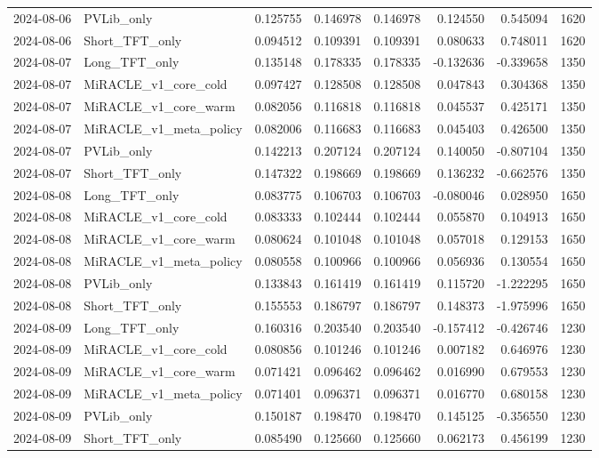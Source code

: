 \begin{tabular}{llrrrrrr}
2024-08-06 & PVLib_only & 0.125755 & 0.146978 & 0.146978 & 0.124550 & 0.545094 & 1620 \\
2024-08-06 & Short_TFT_only & 0.094512 & 0.109391 & 0.109391 & 0.080633 & 0.748011 & 1620 \\
2024-08-07 & Long_TFT_only & 0.135148 & 0.178335 & 0.178335 & -0.132636 & -0.339658 & 1350 \\
2024-08-07 & MiRACLE_v1_core_cold & 0.097427 & 0.128508 & 0.128508 & 0.047843 & 0.304368 & 1350 \\
2024-08-07 & MiRACLE_v1_core_warm & 0.082056 & 0.116818 & 0.116818 & 0.045537 & 0.425171 & 1350 \\
2024-08-07 & MiRACLE_v1_meta_policy & 0.082006 & 0.116683 & 0.116683 & 0.045403 & 0.426500 & 1350 \\
2024-08-07 & PVLib_only & 0.142213 & 0.207124 & 0.207124 & 0.140050 & -0.807104 & 1350 \\
2024-08-07 & Short_TFT_only & 0.147322 & 0.198669 & 0.198669 & 0.136232 & -0.662576 & 1350 \\
2024-08-08 & Long_TFT_only & 0.083775 & 0.106703 & 0.106703 & -0.080046 & 0.028950 & 1650 \\
2024-08-08 & MiRACLE_v1_core_cold & 0.083333 & 0.102444 & 0.102444 & 0.055870 & 0.104913 & 1650 \\
2024-08-08 & MiRACLE_v1_core_warm & 0.080624 & 0.101048 & 0.101048 & 0.057018 & 0.129153 & 1650 \\
2024-08-08 & MiRACLE_v1_meta_policy & 0.080558 & 0.100966 & 0.100966 & 0.056936 & 0.130554 & 1650 \\
2024-08-08 & PVLib_only & 0.133843 & 0.161419 & 0.161419 & 0.115720 & -1.222295 & 1650 \\
2024-08-08 & Short_TFT_only & 0.155553 & 0.186797 & 0.186797 & 0.148373 & -1.975996 & 1650 \\
2024-08-09 & Long_TFT_only & 0.160316 & 0.203540 & 0.203540 & -0.157412 & -0.426746 & 1230 \\
2024-08-09 & MiRACLE_v1_core_cold & 0.080856 & 0.101246 & 0.101246 & 0.007182 & 0.646976 & 1230 \\
2024-08-09 & MiRACLE_v1_core_warm & 0.071421 & 0.096462 & 0.096462 & 0.016990 & 0.679553 & 1230 \\
2024-08-09 & MiRACLE_v1_meta_policy & 0.071401 & 0.096371 & 0.096371 & 0.016770 & 0.680158 & 1230 \\
2024-08-09 & PVLib_only & 0.150187 & 0.198470 & 0.198470 & 0.145125 & -0.356550 & 1230 \\
2024-08-09 & Short_TFT_only & 0.085490 & 0.125660 & 0.125660 & 0.062173 & 0.456199 & 1230 \\

\end{tabular}
